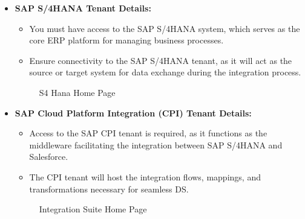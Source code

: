 \begin{itemize}
    \item \textbf{SAP S/4HANA Tenant Details:}
    \begin{itemize}
        \item You must have access to the SAP S/4HANA system, which serves as the core ERP platform for managing business processes.
        \item Ensure connectivity to the SAP S/4HANA tenant, as it will act as the source or target system for data exchange during the integration process.
    \end{itemize}

        \begin{figure}[H]
    \centering
    \caption{S4 Hana Home Page}
    
\end{figure}

    \item \textbf{SAP Cloud Platform Integration (CPI) Tenant Details:}
    \begin{itemize}
        \item Access to the SAP CPI tenant is required, as it functions as the middleware facilitating the integration between SAP S/4HANA and Salesforce.
        \item The CPI tenant will host the integration flows, mappings, and transformations necessary for seamless DS.
    \end{itemize}

\begin{figure}[H]
    \centering
    \caption{Integration Suite Home Page}
    

\end{figure}
\end{itemize}
